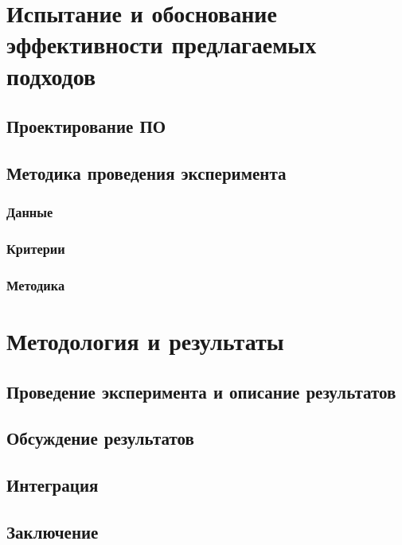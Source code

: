 \chapter{Испытание и обоснование эффективности предлагаемых подходов}
\section{Проектирование ПО}
\section{Методика проведения эксперимента}
\subsection{Данные}
\subsection{Критерии}
\subsection{Методика}

\chapter{Методология и результаты}
\section{Проведение эксперимента и описание результатов}
\section{Обсуждение результатов}
\section{Интеграция}

\section{Заключение}